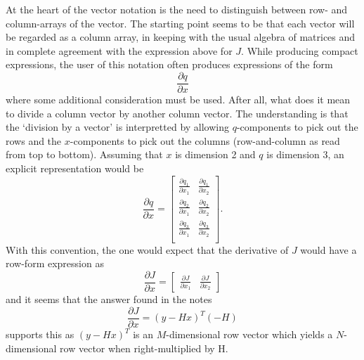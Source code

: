 \documentclass[10pt]{article}
\begin{document}
At the heart of the vector notation is the need to 
distinguish between row- and column-arrays of the vector.
The starting point seems to be that each vector will be regarded as
a column array, in keeping with the usual algebra of matrices and 
in complete agreement with the expression above for $J$.
While producing compact expressions, the user of this notation
often produces expressions of the form
\[
  \frac{\partial q}{\partial x}
\]
where some additional consideration must be used.  After all,
what does it mean to divide a column vector by another column vector.
The understanding is that the `division by a vector' is interpretted
by allowing $q$-components to pick out the rows and the $x$-components
to pick out the columns (row-and-column as read from top to bottom).
Assuming that $x$ is dimension 2 and $q$ is 
dimension 3, an explicit representation would be
\[
  \frac{\partial q}{\partial x} = \left[ 
    \begin{array}{cc}
	  \frac{\partial q_1}{\partial x_1} & \frac{\partial q_1}{\partial x_2} \\
	  \frac{\partial q_2}{\partial x_1} & \frac{\partial q_2}{\partial x_2} \\
	  \frac{\partial q_3}{\partial x_1} & \frac{\partial q_3}{\partial x_2} \\
    \end{array}
  \right]	.
\]
With this convention, the one would expect that the derivative of $J$ would 
have a row-form expression as
\[
 \frac{\partial J}{\partial x} = \left[ 
   \begin{array}{cc} \frac{\partial J}{\partial x_1} & \frac{\partial J}{\partial x_2} \end{array} \right]
\]
and it seems that the answer found in the notes
\[
  \frac{\partial J}{\partial x} = (y - H x)^T (-H)
\]
supports this as $(y - H x)^T$ is an $M$-dimensional row vector which yields a $N$-dimensional 
row vector when right-multiplied by H.
\end{document}
